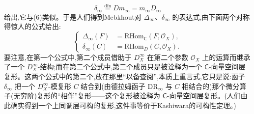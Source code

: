 \begin{equation*}
\delta_{\infty}\overset{\mathrm{dfn}}{=}Dm_{\infty}=m_{\infty}D_{\infty}
\tag{7}
\end{equation*}
给出,它与(6)类似。于是人们得到Mebkhout对 $\Delta_{\infty}$、$\delta_{\infty}$ 的表达式,由下面两个对称得惊人的公式给出:
\begin{equation*}
\left\{\begin{aligned}
\Delta_{\infty}(F)&=\mathrm{RHom}_{\mathsf{C}}(F,\mathcal{O}_{X}),\\
\delta_{\infty}(C)&=\mathrm{RHom}_{D}(C,\mathcal{O}_{X}).
\end{aligned}\right.
\tag{8}
\end{equation*}
要注意,在第一个公式中,第二个成员借助于 $D^{\infty}_{X}$ 在第二个参数 $\mathcal{O}_{X}$ 上的运算而继承了一个 $D^{\infty}_{X}$-结构;而在第二个公式中,第二个成员只是被诠释为一个 $\mathsf{C}$-向量空间层复形。这两个公式中的第二个,放在那里“以备查阅”,本质上重言式,它只是说:函子 $\delta_{\infty}$ 把一个 $D^{\infty}_{X}$-模复形 $C$ 结合到(由德拉姆函子 $\mathrm{DR}_{\infty}$ 与 $C$ 相结合的)那个微分算子(无穷阶)复形的“相伴”复形——这个复形被诠释为 $\mathsf{C}$-向量空间层复形。(人们由此确实得到一个上同调层可构的复形,这件事等价于Kashiwara的可构性定理。)

